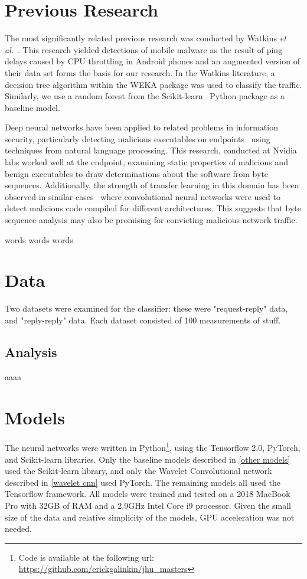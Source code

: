 \documentclass[10pt]{article}
\begin{document}
\section{Previous Research}
The most significantly related previous research was conducted by Watkins \textit{et al.}~\cite{watkins2018network}.
This research yielded detections of mobile malware as the result of ping delays caused by CPU throttling in Android phones and an augmented version of their data set forms the basis for our research.
In the Watkins literature, a decision tree algorithm within the WEKA package was used to classify the traffic.
Similarly, we use a random forest from the Scikit-learn~\cite{scikit-learn} Python package as a baseline model.

Deep neural networks have been applied to related problems in information security, particularly detecting malicious executables on endpoints~\cite{raff2018malware} using techniques from natural language processing.
This research, conducted at Nvidia labs worked well at the endpoint, examining static properties of malicious and benign executables to draw determinations about the software from byte sequences.
Additionally, the strength of transfer learning in this domain has been observed in similar cases~\cite{galinkin2019shape} where convolutional neural networks were used to detect malicious code compiled for different architectures.
This suggests that byte sequence analysis may also be promising for convicting malicious network traffic.

words words words 

\section{Data}
Two datasets were examined for the classifier: these were "request-reply" data, and "reply-reply" data.
Each dataset consisted of 100 measurements of stuff.

\subsection{Analysis}
aaaa

\section{Models}
The neural networks were written in Python\footnote{Code is available at the following url: \url{https://github.com/erickgalinkin/jhu_masters}}, using the Tensorflow 2.0, PyTorch, and Scikit-learn libraries.
Only the baseline models described in \ref{other models} used the Scikit-learn library, and only the Wavelet Convolutional network described in \ref{wavelet cnn} used PyTorch.
The remaining models all used the Tensorflow framework.
All models were trained and tested on a 2018 MacBook Pro with 32GB of RAM and a 2.9GHz Intel Core i9 processor.
Given the small size of the data and relative simplicity of the models, GPU acceleration was not needed.
\end{document}
